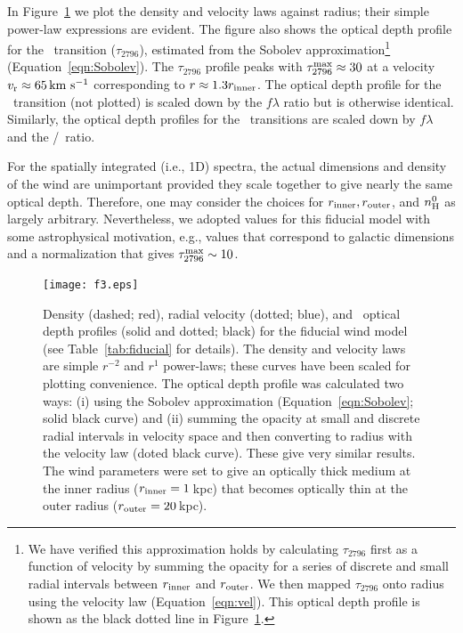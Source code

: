 \documentclass[]{emulateapj}
\begin{document}
In Figure~\ref{fig:fiducial_nvt} we plot the density and velocity
laws against radius;  
their simple power-law expressions are evident.  The figure also
shows the optical depth profile for the \mgiia\ transition
($\tau_{2796}$), estimated from the Sobolev approximation\footnote{We
  have verified this approximation holds by calculating 
  $\tau_{2796}$ first
  as a function of velocity by summing the opacity for a series of
  discrete and small radial intervals
  between $r_{\rm inner}$  and $r_{\rm outer}$.   We then mapped
  $\tau_{2796}$ onto radius using the velocity law
  (Equation~\ref{eqn:vel}). This optical depth profile is shown as the
black dotted line in Figure~\ref{fig:fiducial_nvt}.}
(Equation~\ref{eqn:Sobolev}). 
The $\tau_{2796}$ profile peaks with $\tau_{2796}^{\rm max} \approx 30$
at a velocity $v_{\rm r} \approx 65 \, {\rm km~s^{-1}}$ corresponding to $r \approx 1.3
r_{\rm inner}$.  The optical depth profile for the \mgiib\ transition
(not plotted) is scaled down by the $f\lambda$ ratio but is otherwise identical.  Similarly,
the optical depth profiles for the \feiid\ transitions are
scaled down by $f \lambda$ and the \nfe/\nmg\ ratio.  

For the spatially integrated (i.e., 1D) spectra, the actual dimensions and density of the wind are
unimportant provided they scale together to give nearly the same
optical depth. Therefore, one may consider the choices for
$r_{\rm inner}, r_{\rm outer}$, and $n_{\rm H}^0$ as largely arbitrary.
Nevertheless, we adopted values for this fiducial model with
some astrophysical motivation,  e.g., values that correspond to
galactic dimensions and a normalization that gives $\tau_{2796}^{\rm
  max} \sim 10$.

\begin{figure}
\texttt{[image: f3.eps]}
\caption{
Density (dashed; red), radial velocity (dotted; blue), and
\mgiia\ optical depth profiles (solid and dotted; black) for the fiducial
wind model (see Table~\ref{tab:fiducial} for details).
The density and velocity laws are simple $r^{-2}$ and $r^1$
power-laws; these curves have been scaled for plotting
convenience.  
The optical depth profile was calculated two ways: (i) using the
Sobolev approximation (Equation~\ref{eqn:Sobolev}; solid black curve)
and (ii) summing
the opacity at small and discrete radial intervals in velocity space
and then converting to radius with the velocity law (doted black
curve).  These give
very similar results. 
The wind parameters were set to give an optically thick medium at the
inner radius ($r_{\rm inner} = 1$\,kpc) that becomes optically thin at
the outer radius ($r_{\rm outer} = 20$\,kpc). 
}
\label{fig:fiducial_nvt}
\end{figure}
\end{document}
